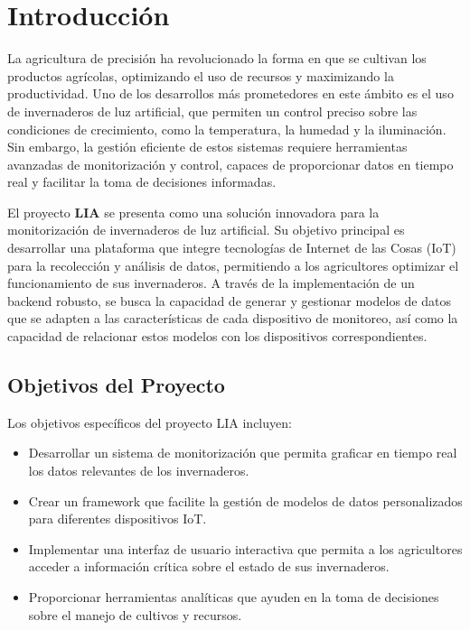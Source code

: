
\section{Introducción}

La agricultura de precisión ha revolucionado la forma en que se cultivan los productos agrícolas, optimizando el uso de recursos y maximizando la productividad. Uno de los desarrollos más prometedores en este ámbito es el uso de invernaderos de luz artificial, que permiten un control preciso sobre las condiciones de crecimiento, como la temperatura, la humedad y la iluminación. Sin embargo, la gestión eficiente de estos sistemas requiere herramientas avanzadas de monitorización y control, capaces de proporcionar datos en tiempo real y facilitar la toma de decisiones informadas.

El proyecto \textbf{LIA} se presenta como una solución innovadora para la monitorización de invernaderos de luz artificial. Su objetivo principal es desarrollar una plataforma que integre tecnologías de Internet de las Cosas (IoT) para la recolección y análisis de datos, permitiendo a los agricultores optimizar el funcionamiento de sus invernaderos. A través de la implementación de un backend robusto, se busca la capacidad de generar y gestionar modelos de datos que se adapten a las características de cada dispositivo de monitoreo, así como la capacidad de relacionar estos modelos con los dispositivos correspondientes.

\subsection{Objetivos del Proyecto}
Los objetivos específicos del proyecto LIA incluyen:

\begin{itemize}
    \item Desarrollar un sistema de monitorización que permita graficar en tiempo real los datos relevantes de los invernaderos.
    \item Crear un framework que facilite la gestión de modelos de datos personalizados para diferentes dispositivos IoT.
    \item Implementar una interfaz de usuario interactiva que permita a los agricultores acceder a información crítica sobre el estado de sus invernaderos.
    \item Proporcionar herramientas analíticas que ayuden en la toma de decisiones sobre el manejo de cultivos y recursos.
\end{itemize}

